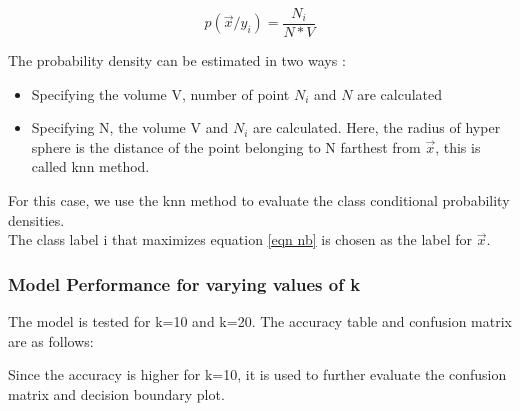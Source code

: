 \documentclass[11pt,a4paper]{article}
\newcommand{\noi}{\noindent}
\begin{document}
\begin{equation}
    p(\vec{x}/y_{i})=\frac{N_{i}}{N*V}
\end{equation}

The probability density can be estimated in two ways :

\begin{itemize}
    \item Specifying the volume V, number of point $N_i$ and $N$ are calculated
    \item Specifying N, the volume V and $N_i$ are calculated. Here, the radius of hyper sphere is the distance of the point belonging to N farthest from $\vec{x}$, this is called knn method.  
\end{itemize}
\noi
For this case, we use the knn method to evaluate the class conditional probability densities.
\\ 
The class label i that maximizes equation \ref{eqn nb} is chosen as the label for $\vec{x}$. 

\subsubsection{Model Performance for varying values of k}

The model is tested for k=10 and k=20. The accuracy table and confusion matrix are as follows:


\noi
Since the accuracy is higher for k=10, it is used to further evaluate the confusion matrix and decision boundary plot. 
\end{document}
